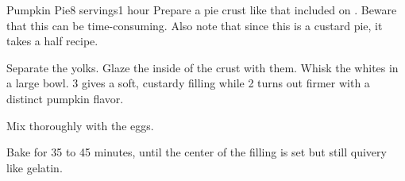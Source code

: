 \documentclass[../Cookbook.tex]{subfiles}
\begin{document}
\begin{recipe}[PumpkinPie]{Pumpkin Pie}{8 servings}{1 hour}
Prepare a pie crust like that included on .
Beware that this can be time-consuming.
Also note that since this is a custard pie, it takes a half recipe.

Separate the yolks. Glaze the inside of the crust with them.
Whisk the whites in a large bowl. 3 gives a soft, custardy filling while 2 turns out firmer with a distinct pumpkin flavor.

Mix thoroughly with the eggs.

Bake for 35 to 45 minutes, until the center of the filling is set but still quivery like gelatin.


\end{recipe}
\end{document}

